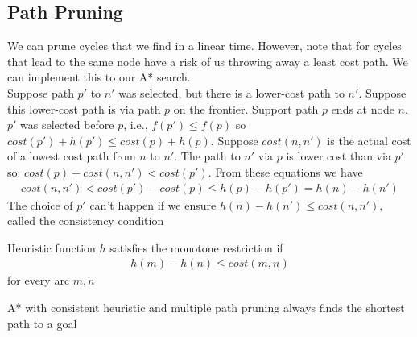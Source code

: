 \documentclass[a4paper]{article}
\theoremstyle{plain}
\theoremstyle{definition}
\newtheorem{defn}{Definition}[section]
\theoremstyle{remark}
\begin{document}
\subsection{Path Pruning}
We can prune cycles that we find in a linear time. However, note that for cycles that lead to the same node have a risk of us throwing away a least cost path. We can implement this to our A* search. \\
Suppose path $p'$ to $n'$ was selected, but there is a lower-cost path to $n'$. Suppose this lower-cost path is via path $p$ on the frontier. Support path $p$ ends at node $n$. $p'$ was selected before $p$, i.e., $f(p')\le f(p)$ so $cost(p')+h(p') \le cost(p) + h(p)$. Suppose $cost(n,n')$ is the actual cost of a lowest cost path from $n$ to $n'$. The path to $n'$ via $p$ is lower cost than via $p'$ so: $cost(p) + cost(n,n') < cost(p')$. From these equations we have
\begin{align*}
	cost(n,n') < cost(p') - cost(p) \le h(p) - h(p') = h(n)- h(n')
\end{align*}
The choice of $p'$ can't happen if we ensure $h(n)-h(n') \le cost(n,n'),$ called the consistency condition
\begin{tcolorbox}[colback=black!3!white,colframe=black!60!white,title=\begin{defn}Monotone Restriction \label{Monotone Restriction}\end{defn}]
Heuristic function $h$ satisfies the monotone restriction if 
\begin{align*}
	h(m) - h(n) \le cost(m,n)
\end{align*}
for every arc $m,n$
\end{tcolorbox}
A* with consistent heuristic and multiple path pruning always finds the shortest path to a goal
\end{document}
